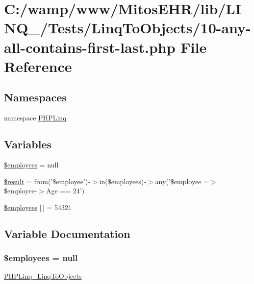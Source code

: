\hypertarget{_linq_to_objects_210-any-all-contains-first-last_8php}{\section{\-C\-:/wamp/www/\-Mitos\-E\-H\-R/lib/\-L\-I\-N\-Q\-\_/\-Tests/\-Linq\-To\-Objects/10-\/any-\/all-\/contains-\/first-\/last.php \-File \-Reference}
\label{_linq_to_objects_210-any-all-contains-first-last_8php}
}
\subsection*{\-Namespaces}
\begin{DoxyCompactItemize}
\item 
namespace \hyperlink{namespace_p_h_p_linq}{\-P\-H\-P\-Linq}
\end{DoxyCompactItemize}
\subsection*{\-Variables}
\begin{DoxyCompactItemize}
\item 
\hyperlink{_linq_to_objects_210-any-all-contains-first-last_8php_a598c06abe9d65a9d2990e39693ce2c27}{\$employees} = null
\item 
\hyperlink{_linq_to_objects_210-any-all-contains-first-last_8php_a112ef069ddc0454086e3d1e6d8d55d07}{\$result} = from('\$employee')-\/$>$in(\$employees)-\/$>$any('\$employee =$>$ \$employee-\/$>$\-Age == 24')
\item 
\hyperlink{_linq_to_objects_210-any-all-contains-first-last_8php_ac6c9b1497734c730d854ef71d906cf0f}{\$employees} \mbox{[}$\,$\mbox{]} = 54321
\end{DoxyCompactItemize}


\subsection{\-Variable \-Documentation}
\hypertarget{_linq_to_objects_210-any-all-contains-first-last_8php_a598c06abe9d65a9d2990e39693ce2c27}{
\subsubsection[{\$employees}]{\setlength{\rightskip}{0pt plus 5cm}\$employees = null}}\label{_linq_to_objects_210-any-all-contains-first-last_8php_a598c06abe9d65a9d2990e39693ce2c27}
\hyperlink{class_p_h_p_linq___linq_to_objects}{\-P\-H\-P\-Linq\-\_\-\-Linq\-To\-Objects} 

